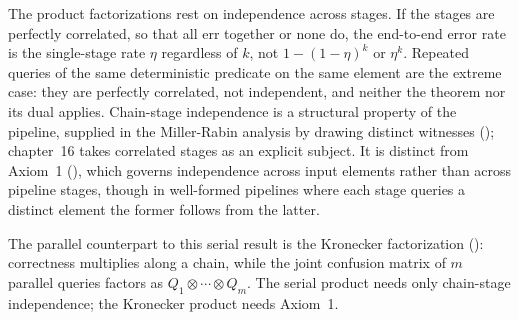 \begin{remark}
\label{rem:composition-independence}
The product factorizations rest on independence across stages. If the stages
are perfectly correlated, so that all err together or none do, the end-to-end
error rate is the single-stage rate $\eta$ regardless of $k$, not $1 -
(1 - \eta)^k$ or $\eta^k$. Repeated queries of the same deterministic predicate
on the same element are the extreme case: they are perfectly correlated, not
independent, and neither the theorem nor its dual applies. Chain-stage
independence is a structural property of the pipeline, supplied in the
Miller-Rabin analysis by drawing distinct witnesses ();
chapter~16 takes correlated stages as an explicit subject. It is distinct from
Axiom~1 (), which governs independence across input
elements rather than across pipeline stages, though in well-formed pipelines
where each stage queries a distinct element the former follows from the latter.
\end{remark}

The parallel counterpart to this serial result is the Kronecker factorization
(): correctness multiplies along a chain, while the joint
confusion matrix of $m$ parallel queries factors as $Q_1 \otimes \cdots \otimes
Q_m$. The serial product needs only chain-stage independence; the Kronecker
product needs Axiom~1.
